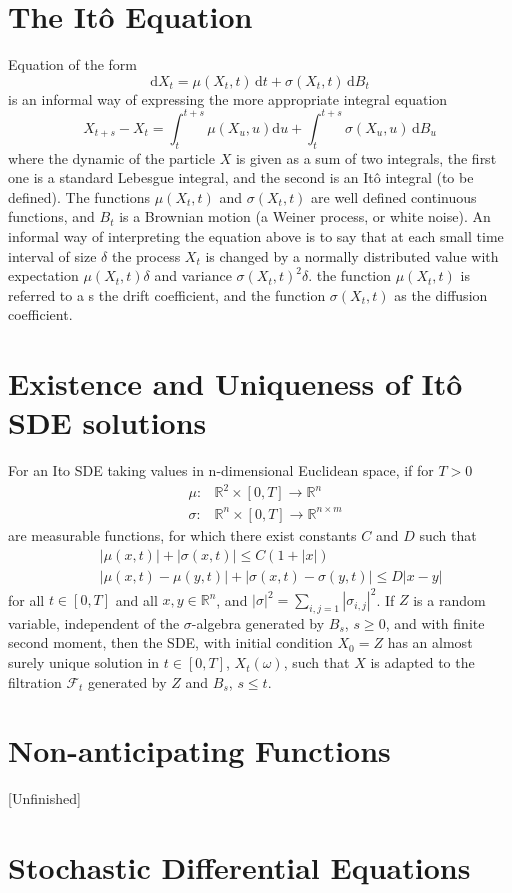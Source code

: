 \documentclass[12pt]{report}
\begin{document}
\section{The It\^{o} Equation}
Equation of the form 
\begin{equation*}
 \mathrm{d} X_t = \mu(X_t,t)\, \mathrm{d} t +  \sigma(X_t,t)\, \mathrm{d} B_t
\end{equation*}
is an informal way of expressing the more appropriate integral equation 
\begin{equation*}
X_{t+s} - X_{t} = \int_t^{t+s} \mu(X_u,u) \mathrm{d} u + \int_t^{t+s} \sigma(X_u,u)\, \mathrm{d} B_u
\end{equation*}
where the dynamic of the particle $X$ is given as a sum of two integrals, the first one is a standard Lebesgue integral, and the second is an It\^{o} integral (to be defined).  
The functions $\mu(X_t,t)$ and $\sigma(X_t,t)$ are well defined continuous functions, and $B_t$ is a Brownian motion (a Weiner process, or white noise). An informal way of interpreting the equation above is to say that at each small time interval of size $\delta$ the process $X_t$ is changed by a normally distributed value with expectation $\mu(X_t,t)\delta$ and variance $\sigma(X_t,t)^2\delta$. 
the function $\mu(X_t,t)$ is referred to a s the drift coefficient, and the function $\sigma(X_t,t)$ as the diffusion coefficient. 

\section{Existence and Uniqueness of It\^{o} SDE solutions}
For an Ito SDE taking values in n-dimensional Euclidean space, if for $T>0$\\
\begin{eqnarray*}
&\mu:&\mathbb{R}^2\times[0,T]\rightarrow \mathbb{R}^n\\
&\sigma:&\mathbb{R}^n \times[0,T] \rightarrow \mathbb{R}^{n\times m}
\end{eqnarray*}
are measurable functions, for which there exist constants $C$ and $D$ such that 
\begin{eqnarray*}
&&|\mu(x,t)|+|\sigma(x,t)|\leq C(1+|x|)\\
&&|\mu(x,t)-\mu(y,t)|+|\sigma(x,t)-\sigma(y,t)|\leq D|x-y|
\end{eqnarray*}
for all $t\in [0,T]$ and all $x,y\in \mathbb{R}^n$, and $|\sigma|^2=\sum_{i,j=1}|\sigma_{i,j}|^2$. 
If $Z$ is a random variable, independent of the $\sigma$-algebra generated by $B_s$, $s\geq 0$, and with finite second moment, then the SDE, with initial condition $X_0=Z$ has an almost surely unique solution in $t\in[0,T]$, $X_t(\omega)$, such that $X$ is adapted to the filtration $\mathcal{F}_t$ generated by $Z$ and $B_s$, $s\leq t$.

\section{Non-anticipating Functions}{[Unfinished]}

\section{Stochastic Differential Equations}




\end{document}
